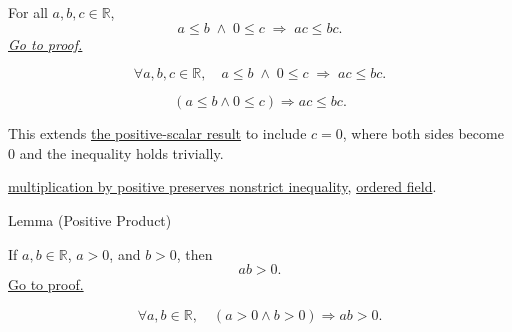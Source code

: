 \begin{theorem}
\label{thm:ineq-nonstrict-multiply-nonneg}
For all $a, b, c \in \mathbb{R}$,
\[
  a \le b \;\land\; 0 \le c \;\Rightarrow\; ac \le bc.
\]
\hyperref[prf:ineq-nonstrict-multiply-nonneg]{\textit{Go to proof.}}
\end{theorem}



\begin{remark*}
\[
  \forall a, b, c \in \mathbb{R},\quad
  a \le b \;\land\; 0 \le c \;\Rightarrow\; ac \le bc.
\]
\end{remark*}

\begin{remark*}
\[
(a\le b\land 0\le c)\Rightarrow ac\le bc.
\]
\end{remark*}

\begin{remark*}[Interpretation]
This extends
\hyperref[thm:ineq-nonstrict-multiply-positive]{the positive-scalar result}
to include $c = 0$, where both sides become $0$ and the inequality holds
trivially.
\end{remark*}

\begin{dependencies}
\hyperref[thm:ineq-nonstrict-multiply-positive]{multiplication by positive preserves nonstrict inequality},
\hyperref[def:real-ordered-field]{ordered field}.
\end{dependencies}

\begin{lemmabox}{Lemma (Positive Product)}
\begin{lemma}\label{lem:positive-product}
If $a,b\in\mathbb{R}$, $a>0$, and $b>0$, then
\[
ab>0.
\]
\hyperref[prf:positive-product]{Go to proof.}
\end{lemma}
\end{lemmabox}

\begin{remark*}
\[
\forall a,b\in\mathbb{R},\quad (a>0\land b>0)\Rightarrow ab>0.
\]
\end{remark*}

